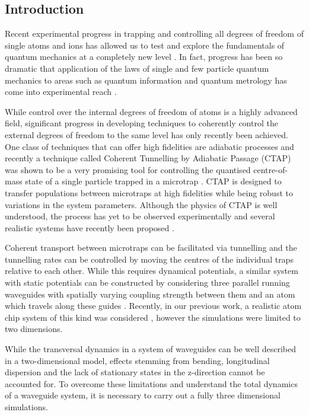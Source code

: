 \subsection{Introduction}
\label{sec:Introduction}
Recent experimental progress in trapping and controlling all degrees of freedom of single atoms and ions has allowed us to test and
explore the fundamentals of quantum mechanics at a completely new level \cite{Chen:11,Bergmann:98}. In fact, progress has been so dramatic that application of the laws of single and few particle quantum mechanics to areas such as quantum information and quantum metrology has come into experimental reach \cite{Nielsen:00,Riedel:10}.

While control over the internal degrees of freedom of atoms is a highly advanced field, significant progress in developing techniques to coherently control the external degrees of freedom to the same level has only recently been achieved. One class of techniques that can offer high fidelities are adiabatic processes and recently a technique called Coherent Tunnelling by Adiabatic Passage (CTAP) was shown to be a very promising tool for controlling the quantised centre-of-mass state of a single particle trapped in a microtrap \cite{Eckert:04}. CTAP is designed to transfer populations between microtraps at high fidelities while being robust to variations in the system parameters. Although the physics of CTAP is well understood, the process has yet to be observed experimentally and several realistic systems have recently been proposed \cite{Eckert:06,Morgan:11,Kohler:13}.

Coherent transport between microtraps can be facilitated via tunnelling and the tunnelling rates  can be controlled by moving the centres of the individual traps relative to each other. While this requires dynamical potentials, a similar system with static potentials can be constructed by considering three parallel running waveguides with spatially varying coupling strength between them  and an atom which travels along these guides \cite{Eckert:06}. Recently, in our previous work, a realistic atom chip system of this kind was considered \cite{OSullivan:10}, however the simulations were limited to two dimensions.

While the transversal dynamics in a system of waveguides can be well described in a two-dimensional model, effects stemming from bending, longitudinal dispersion and the lack of stationary states in the z-direction cannot be accounted for. To overcome these limitations and understand the total dynamics of a waveguide system, it is necessary to carry out a fully three dimensional simulations.
  

